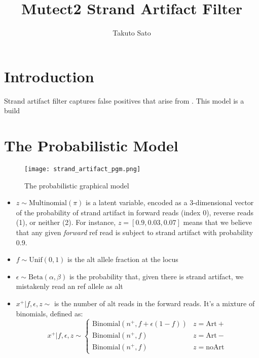 \documentclass[a4paper]{article}
\title{Mutect2 Strand Artifact Filter}
\author{Takuto Sato}
\begin{document}
\maketitle

\section{Introduction}


Strand artifact filter captures false positives that arise from . This model is a build 

\section{The Probabilistic Model}
\begin{figure}
\centering
\texttt{[image: strand\_artifact\_pgm.png]}
\caption{\label{fig:frog}The probabilistic graphical model}
\end{figure}

\begin{itemize}
	\item $z \sim \text{Multinomial}(\pi)$ is a latent variable, encoded as a 3-dimensional vector of the probability of strand artifact in forward reads (index 0), reverse reads (1), or neither (2). For instance, $z = [0.9, 0.03, 0.07]$ means that we believe that any given \textit{forward} ref read is subject to strand artifact with probability 0.9.
	\item $f \sim \text{Unif}(0, 1)$ is the alt allele fraction at the locus
	\item $\epsilon \sim \text{Beta}(\alpha, \beta)$ is the probability that, given there is strand artifact, we mistakenly read an ref allele as alt
	\item $x^+ | f, \epsilon, z \sim$ is the number of alt reads in the forward reads. It's a mixture of binomials, defined as:
	$$
	x^+ | f, \epsilon, z \sim
		\begin{cases}
			\text{Binomial} (n^+, f + \epsilon(1-f)) & z = \mathrm{Art+}\\
			 \text{Binomial} (n^+, f) 			& z = \mathrm{Art-} \\
			 \text{Binomial} (n^+, f)			& z = \mathrm{noArt}
		\end{cases}
	$$
\end{itemize}
\end{document}
